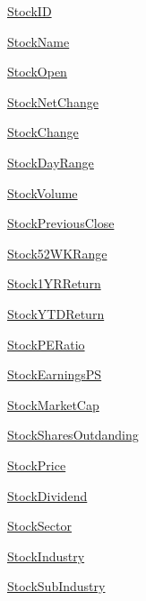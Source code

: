 \begin{DoxyCompactItemize}
\item 
\hyperlink{classmain_1_1_stock_a77b6fa261dbd9ad0cfe936813fcd52d8}{Stock\+I\+D}
\item 
\hyperlink{classmain_1_1_stock_a0524642a24f906908057fc856bf8b934}{Stock\+Name}
\item 
\hyperlink{classmain_1_1_stock_a9d8b9d86709c3e05418f42a640fdd726}{Stock\+Open}
\item 
\hyperlink{classmain_1_1_stock_a1e13499cdd63181712c9a2172c1324f7}{Stock\+Net\+Change}
\item 
\hyperlink{classmain_1_1_stock_a765f23d2b8993bfbbf451878d904a8b5}{Stock\+Change}
\item 
\hyperlink{classmain_1_1_stock_ac3330e3a24b3b98f6d6ff473df0c3ee0}{Stock\+Day\+Range}
\item 
\hyperlink{classmain_1_1_stock_acdc8aee532419fee7bb9ed6899a85dc8}{Stock\+Volume}
\item 
\hyperlink{classmain_1_1_stock_a71a0b8843b74ca23c36eee4c674a1cdc}{Stock\+Previous\+Close}
\item 
\hyperlink{classmain_1_1_stock_a9f7f93b20abf89c2c4fefe29eca96a3f}{Stock52\+W\+K\+Range}
\item 
\hyperlink{classmain_1_1_stock_a72fbcd8b73568c8e7bebe1685e4f54a4}{Stock1\+Y\+R\+Return}
\item 
\hyperlink{classmain_1_1_stock_a8cec4083fb19e7b9e859a5faa4ac357a}{Stock\+Y\+T\+D\+Return}
\item 
\hyperlink{classmain_1_1_stock_ad5ce8d34ee7416808bbbd1d7af35d32f}{Stock\+P\+E\+Ratio}
\item 
\hyperlink{classmain_1_1_stock_a4677af01671c33ca260468ff0a91cc7d}{Stock\+Earnings\+P\+S}
\item 
\hyperlink{classmain_1_1_stock_a77bdc6c48184208602097df662df0006}{Stock\+Market\+Cap}
\item 
\hyperlink{classmain_1_1_stock_a884e45377d572ba964b7e86f37914e0f}{Stock\+Shares\+Outdanding}
\item 
\hyperlink{classmain_1_1_stock_abd14ef43a9660f6c6675a7d45d8143d9}{Stock\+Price}
\item 
\hyperlink{classmain_1_1_stock_a579c29d08779691487da73f65b2d6c2a}{Stock\+Dividend}
\item 
\hyperlink{classmain_1_1_stock_a72f5eb1d0f67421350aa7b5a0e54d878}{Stock\+Sector}
\item 
\hyperlink{classmain_1_1_stock_a46d77dca6c0ea221081335f3cf4a1f50}{Stock\+Industry}
\item 
\hyperlink{classmain_1_1_stock_adf3644a84fa90150a5e33b7bc22bb70b}{Stock\+Sub\+Industry}
\end{DoxyCompactItemize}


